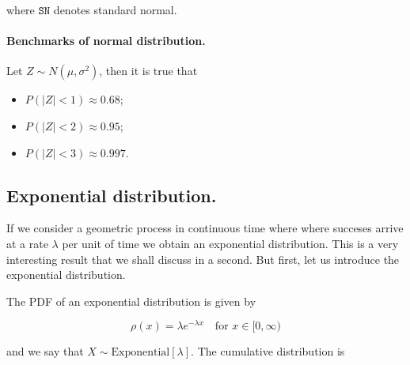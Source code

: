 \documentclass[12pt]{article}
\begin{document}
\noindent
where $\texttt{SN}$ denotes standard normal.

\paragraph{Benchmarks of normal distribution.}
Let $Z \sim N(\mu, \sigma^{2})$, then it is true that

\begin{center}
\begin{itemize}
\item $P ( |Z| < 1 ) \approx 0.68$;
\item $P ( |Z| < 2 ) \approx 0.95$;
\item $P ( |Z| < 3 ) \approx 0.997$.
\end{itemize}
\end{center}

\subsection{Exponential distribution.}

If we consider a geometric process in continuous time where where 
succeses arrive at a rate $\lambda$ per unit of time we obtain an exponential
distribution. This is a very interesting result that we shall discuss in a second.
But first, let us introduce the exponential distribution.


The PDF of an exponential distribution is
given by

\begin{equation}
\rho(x) = \lambda e^{-\lambda x}
\quad 
\text{for } 
x \in [0, \infty)
\end{equation}

\noindent
and we say that $X \sim \text{Exponential}[\lambda]$. 
The cumulative distribution is 
\end{document}
